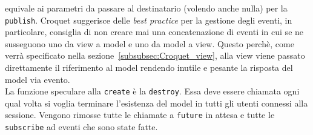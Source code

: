 equivale ai parametri da passare al destinatario (volendo anche nulla) per la \texttt{publish}.
Croquet suggerisce delle \textit{best practice} per la gestione degli eventi, in particolare, consiglia di non creare mai una concatenazione di eventi in cui se ne susseguono uno
da view a model e uno da model a view. Questo perchè, come verrà specificato nella sezione~\ref{subsubsec:Croquet_view}, alla view viene passato direttamente il riferimento
al model rendendo inutile e pesante la risposta del model via evento.\\
\newline
La funzione speculare alla \texttt{create} è la \texttt{destroy}. Essa deve essere chiamata ogni qual volta si voglia terminare l'esistenza del model in tutti gli utenti connessi alla
sessione. Vengono rimosse tutte le chiamate a \texttt{future} in attesa e tutte le \texttt{subscribe} ad eventi che sono state fatte.\\

